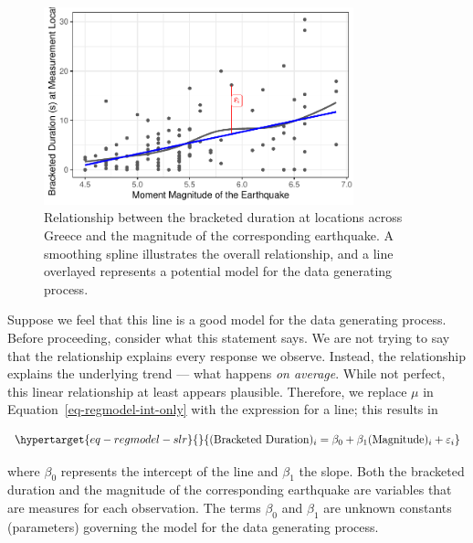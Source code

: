 \documentclass[
  letterpaper,
  DIV=11,
  numbers=noendperiod]{scrreprt}
\theoremstyle{definition}
\theoremstyle{definition}
\theoremstyle{plain}
\theoremstyle{remark}
\begin{document}
\begin{figure}

{\centering \includegraphics[width=0.8\textwidth,height=\textheight]{./images/fig-regmodel-slr-plot-1.pdf}

}

\caption{\label{fig-regmodel-slr-plot}Relationship between the bracketed
duration at locations across Greece and the magnitude of the
corresponding earthquake. A smoothing spline illustrates the overall
relationship, and a line overlayed represents a potential model for the
data generating process.}

\end{figure}

Suppose we feel that this line is a good model for the data generating
process. Before proceeding, consider what this statement says. We are
not trying to say that the relationship explains every response we
observe. Instead, the relationship explains the underlying trend ---
what happens \emph{on average}. While not perfect, this linear
relationship at least appears plausible. Therefore, we replace \(\mu\)
in Equation~\ref{eq-regmodel-int-only} with the expression for a line;
this results in

\begin{equation}\protect\hypertarget{eq-regmodel-slr}{}{(\text{Bracketed Duration})_i = \beta_0 + \beta_1 (\text{Magnitude})_i + \varepsilon_i}\label{eq-regmodel-slr}\end{equation}

where \(\beta_0\) represents the intercept of the line and \(\beta_1\)
the slope. Both the bracketed duration and the magnitude of the
corresponding earthquake are variables that are measures for each
observation. The terms \(\beta_0\) and \(\beta_1\) are unknown constants
(parameters) governing the model for the data generating process.
\end{document}
